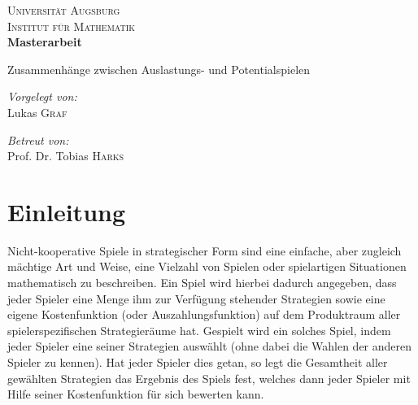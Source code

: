 \documentclass[a4paper,ngerman,11pt,bibliography=totoc]{scrartcl}
\theoremstyle{definition}
\theoremstyle{plain}
\theoremstyle{remark}
\begin{document}
	
	
	

\author{Lukas Graf}
\date{Letzte Aktualisierung: \today}

\thispagestyle{empty}


\begin{titlepage}\centering
	\textsc{\LARGE Universität Augsburg}\\[1cm]
	
	\textsc{\Large Institut für Mathematik}\\[2.5cm]
	
	{\huge \bfseries Masterarbeit \\[1.5cm]}
	{\Huge{} Zusammenhänge zwischen Auslastungs- und Potentialspielen \par}

	\vfill
	
	\begin{minipage}{0.4\textwidth}
		\begin{flushleft} \large
			\emph{Vorgelegt von:}\\
			Lukas \textsc{Graf}
		\end{flushleft}
	\end{minipage}
	\begin{minipage}{0.4\textwidth}
		\begin{flushright} \large
			\emph{Betreut von:} \\
			Prof. Dr. Tobias \textsc{Harks}
		\end{flushright}
	\end{minipage}
	
\end{titlepage}


\newpage\null\thispagestyle{empty}\newpage
\tableofcontents
\newpage\null\thispagestyle{empty}\newpage

{}
\section*{Einleitung}

Nicht-kooperative Spiele in strategischer Form sind eine einfache, aber zugleich mächtige Art und Weise, eine Vielzahl von Spielen oder spielartigen Situationen mathematisch zu beschreiben. Ein Spiel wird hierbei dadurch angegeben, dass jeder Spieler eine Menge ihm zur Verfügung stehender Strategien sowie eine eigene Kostenfunktion (oder Auszahlungsfunktion) auf dem Produktraum aller spielerspezifischen Strategieräume hat. \glqq Gespielt\grqq{} wird ein solches Spiel, indem jeder Spieler eine seiner Strategien auswählt (ohne dabei die Wahlen der anderen Spieler zu kennen). Hat jeder Spieler dies getan, so legt die Gesamtheit aller gewählten Strategien das Ergebnis des Spiels fest, welches dann jeder Spieler mit Hilfe seiner Kostenfunktion für sich bewerten kann.
\end{document}

